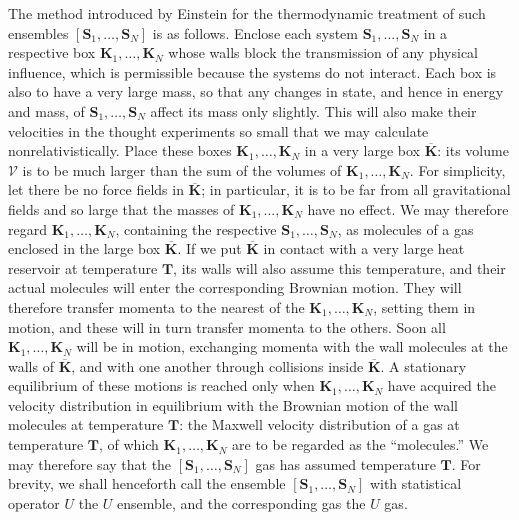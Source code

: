 \documentclass[fontsize=13pt,twoside,openany,headings=normal,parskip=false,bookmarkpackage=false,DIV=calc]{scrbook}
\begin{document}
The method introduced by Einstein for the thermodynamic treatment of such ensembles $[\boldsymbol{S}_1,\ldots,\boldsymbol{S}_N]$ is as follows. Enclose each system $\boldsymbol{S}_1,\ldots,\boldsymbol{S}_N$ in a respective box $\boldsymbol{K}_1,\ldots,\boldsymbol{K}_N$ whose walls block the transmission of any physical influence, which is permissible because the systems do not interact. Each box is also to have a very large mass, so that any changes in state, and hence in energy and mass, of $\boldsymbol{S}_1,\ldots,\boldsymbol{S}_N$ affect its mass only slightly. This will also make their velocities in the thought experiments so small that we may calculate nonrelativistically. Place these boxes $\boldsymbol{K}_1,\ldots,\boldsymbol{K}_N$ in a very large box $\overline{\boldsymbol{K}}$: its volume $\mathcal V$ is to be much larger than the sum of the volumes of $\boldsymbol{K}_1,\ldots,\boldsymbol{K}_N$. For simplicity, let there be no force fields in $\overline{\boldsymbol{K}}$; in particular, it is to be far from all gravitational fields and so large that the masses of $\boldsymbol{K}_1,\ldots,\boldsymbol{K}_N$ have no effect. We may therefore regard $\boldsymbol{K}_1,\ldots,\boldsymbol{K}_N$, containing the respective $\boldsymbol{S}_1,\ldots,\boldsymbol{S}_N$, as molecules of a gas enclosed in the large box $\overline{\boldsymbol{K}}$. If we put $\overline{\boldsymbol{K}}$ in contact with a very large heat reservoir at temperature $\mathbf T$, its walls will also assume this temperature, and their actual molecules will enter the corresponding Brownian motion. They will therefore
\hypertarget{origpage-193}{}%
transfer momenta to the nearest of the $\boldsymbol{K}_1,\ldots,\boldsymbol{K}_N$, setting them in motion, and these will in turn transfer momenta to the others. Soon all $\boldsymbol{K}_1,\ldots,\boldsymbol{K}_N$ will be in motion, exchanging momenta with the wall molecules at the walls of $\overline{\boldsymbol{K}}$, and with one another through collisions inside $\overline{\boldsymbol{K}}$. A stationary equilibrium of these motions is reached only when $\boldsymbol{K}_1,\ldots,\boldsymbol{K}_N$ have acquired the velocity distribution in equilibrium with the Brownian motion of the wall molecules at temperature $\mathbf T$: the Maxwell velocity distribution of a gas at temperature $\mathbf T$, of which $\boldsymbol{K}_1,\ldots,\boldsymbol{K}_N$ are to be regarded as the ``molecules.'' We may therefore say that the $[\boldsymbol{S}_1,\ldots,\boldsymbol{S}_N]$ gas has assumed temperature $\mathbf T$. For brevity, we shall henceforth call the ensemble $[\boldsymbol{S}_1,\ldots,\boldsymbol{S}_N]$ with statistical operator $U$ the $U$ ensemble, and the corresponding gas the $U$ gas.
\end{document}

